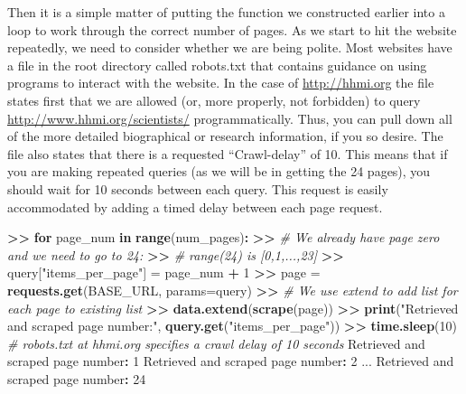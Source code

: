 \documentclass[]{krantz}
\newenvironment{Shaded}{\begin{snugshade}}{\end{snugshade}}
\newcommand{\KeywordTok}[1]{\textcolor[rgb]{0.13,0.29,0.53}{\textbf{#1}}}
\newcommand{\DataTypeTok}[1]{\textcolor[rgb]{0.13,0.29,0.53}{#1}}
\newcommand{\DecValTok}[1]{\textcolor[rgb]{0.00,0.00,0.81}{#1}}
\newcommand{\StringTok}[1]{\textcolor[rgb]{0.31,0.60,0.02}{#1}}
\newcommand{\CommentTok}[1]{\textcolor[rgb]{0.56,0.35,0.01}{\textit{#1}}}
\newcommand{\ControlFlowTok}[1]{\textcolor[rgb]{0.13,0.29,0.53}{\textbf{#1}}}
\newcommand{\OperatorTok}[1]{\textcolor[rgb]{0.81,0.36,0.00}{\textbf{#1}}}
\newcommand{\ErrorTok}[1]{\textcolor[rgb]{0.64,0.00,0.00}{\textbf{#1}}}
\newcommand{\NormalTok}[1]{#1}
\begin{document}
Then it is a simple matter of putting the function we constructed
earlier into a loop to work through the correct number of pages. As we
start to hit the website repeatedly, we need to consider whether we are
being polite. Most websites have a file in the root directory called
robots.txt that contains guidance on using programs to interact with the
website. In the case of \url{http://hhmi.org} the file states first that
we are allowed (or, more properly, not forbidden) to query
\url{http://www.hhmi.org/scientists/} programmatically. Thus, you can
pull down all of the more detailed biographical or research information,
if you so desire. The file also states that there is a requested
``Crawl-delay'' of 10. This means that if you are making repeated
queries (as we will be in getting the 24 pages), you should wait for 10
seconds between each query. This request is easily accommodated by
adding a timed delay between each page request.

\pagebreak

\begin{Shaded}
\begin{Highlighting}[]
\OperatorTok{>}\ErrorTok{>}\StringTok{ }\ControlFlowTok{for}\NormalTok{ page_num }\ControlFlowTok{in} \KeywordTok{range}\NormalTok{(num_pages)}\OperatorTok{:}
\ErrorTok{>>}\StringTok{ }\CommentTok{# We already have page zero and we need to go to 24:}
\ErrorTok{>>}\StringTok{ }\CommentTok{# range(24) is [0,1,...,23]}
\ErrorTok{>>}\StringTok{    }\NormalTok{query[}\StringTok{"items_per_page"}\NormalTok{] =}\StringTok{ }\NormalTok{page_num }\OperatorTok{+}\StringTok{ }\DecValTok{1}
\OperatorTok{>}\ErrorTok{>}\StringTok{    }\NormalTok{page =}\StringTok{ }\KeywordTok{requests.get}\NormalTok{(BASE_URL, }\DataTypeTok{params=}\NormalTok{query)}
\OperatorTok{>}\ErrorTok{>}\StringTok{ }\CommentTok{# We use extend to add list for each page to existing list}
\ErrorTok{>>}\StringTok{    }\KeywordTok{data.extend}\NormalTok{(}\KeywordTok{scrape}\NormalTok{(page))}
\OperatorTok{>}\ErrorTok{>}\StringTok{ }\KeywordTok{print}\NormalTok{(}\StringTok{"Retrieved and scraped page number:"}\NormalTok{, }\KeywordTok{query.get}\NormalTok{(}\StringTok{"items_per_page"}\NormalTok{))}
\OperatorTok{>}\ErrorTok{>}\StringTok{ }\KeywordTok{time.sleep}\NormalTok{(}\DecValTok{10}\NormalTok{) }\CommentTok{# robots.txt at hhmi.org specifies a crawl delay of 10 seconds}
\NormalTok{Retrieved and scraped page number}\OperatorTok{:}\StringTok{ }\DecValTok{1}
\NormalTok{Retrieved and scraped page number}\OperatorTok{:}\StringTok{ }\DecValTok{2}
\NormalTok{...}
\NormalTok{Retrieved and scraped page number}\OperatorTok{:}\StringTok{ }\DecValTok{24}
\end{Highlighting}
\end{Shaded}
\end{document}
